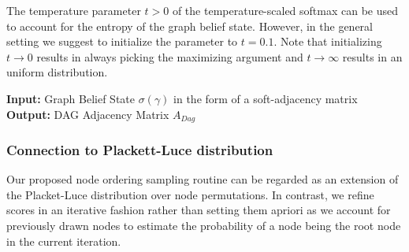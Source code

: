 \documentclass[nohyperref]{article}
\theoremstyle{plain}
\theoremstyle{definition}
\theoremstyle{remark}
\begin{document}
The temperature parameter $t>0$ of the temperature-scaled softmax can be used to account for the entropy of the graph belief state. However, in the general setting we suggest to initialize the parameter to $t=0.1$. Note that initializing $t \rightarrow 0$ results in always picking the maximizing argument and $t \rightarrow \infty $ results in an uniform distribution.


\begin{algorithm}[hp!]
    \caption{Two-Stage DAG Sampling}\label{algorithm}
    \textbf{Input:} Graph Belief State $\sigma(\gamma)$ in the form of a soft-adjacency matrix\\
    \textbf{Output:} DAG Adjacency Matrix $A_{Dag}$
    \begin{algorithmic}[1]
        \item[]
        \item[] 
        \EndFor
        \State{$\prec = [r_0, ..., r_{N-1}]$}
        \item[] 
        \item[]
    \end{algorithmic}
    \label{algo:DAGSampling}
\end{algorithm}


\subsubsection{Connection to Plackett-Luce distribution \citep{Luce59, plackett1975analysis}} 
Our proposed node ordering sampling routine can be regarded as an extension of the Placket-Luce distribution over node permutations. In contrast, we refine scores in an iterative fashion rather than setting them apriori as we account for previously drawn nodes to estimate the probability of a node being the root node in the current iteration.
\end{document}
